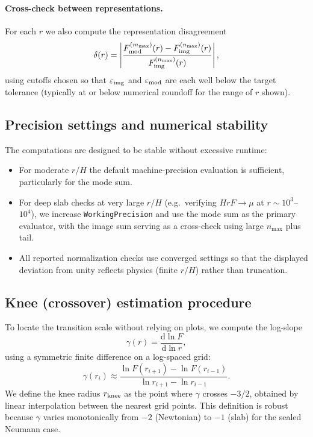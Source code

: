 \documentclass[11pt]{article}
\newcommand{\dd}{\mathrm{d}}
\begin{document}
\paragraph{Cross-check between representations.}
For each $r$ we also compute the representation disagreement
\begin{equation}
  \delta(r)
  = \left|\frac{F_{\rm mod}^{(m_{\max})}(r)-F_{\rm img}^{(n_{\max})}(r)}{F_{\rm img}^{(n_{\max})}(r)}\right|,
\end{equation}
using cutoffs chosen so that $\varepsilon_{\rm img}$ and $\varepsilon_{\rm mod}$ are each well below
the target tolerance (typically at or below numerical roundoff for the range of $r$ shown).

\subsection{Precision settings and numerical stability}

The computations are designed to be stable without excessive runtime:
\begin{itemize}
  \item For moderate $r/H$ the default machine-precision evaluation is sufficient, particularly for
        the mode sum.
  \item For deep slab checks at very large $r/H$ (e.g.\ verifying $HrF\to\mu$ at $r\sim 10^3$--$10^4$),
        we increase \texttt{WorkingPrecision} and use the mode sum as the primary evaluator, with the
        image sum serving as a cross-check using large $n_{\max}$ plus tail.
  \item All reported normalization checks use converged settings so that the displayed deviation from
        unity reflects physics (finite $r/H$) rather than truncation.
\end{itemize}

\subsection{Knee (crossover) estimation procedure}

To locate the transition scale without relying on plots, we compute the log-slope
\begin{equation}
  \gamma(r)=\frac{\dd\ln F}{\dd\ln r},
\end{equation}
using a symmetric finite difference on a log-spaced grid:
\begin{equation}
  \gamma(r_i)\approx
  \frac{\ln F(r_{i+1})-\ln F(r_{i-1})}{\ln r_{i+1}-\ln r_{i-1}}.
\end{equation}
We define the knee radius $r_{\rm knee}$ as the point where $\gamma$ crosses $-3/2$, obtained by
linear interpolation between the nearest grid points.
This definition is robust because $\gamma$ varies monotonically from $-2$ (Newtonian) to $-1$ (slab)
for the sealed Neumann case.
\end{document}
